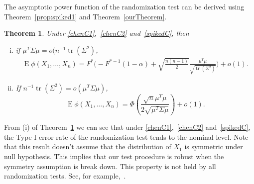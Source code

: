 \documentclass[3p]{elsarticle}
\DeclareMathOperator{\mytr}{tr}
\DeclareMathOperator{\myE}{E}
\theoremstyle{plain}
\newtheorem{theorem}{\quad\quad Theorem}
\theoremstyle{definition}
\newtheorem{remark}{\quad\quad Remark}
\theoremstyle{remark}
\begin{document}
The asymptotic power function of the randomization test can be derived using Theorem~\ref{prop:spiked1} and Theorem~\ref{ourTheorem}.

\begin{theorem}\label{theoremPower}
    Under \eqref{chenC1},~\eqref{chenC2} and~\eqref{spikedC}, then
    \begin{enumerate}[(i)]
        \item
if $\mu^T \Sigma \mu= o(n^{-1}\mytr(\Sigma^2)$,
    \begin{equation}\label{oPower}
        \begin{aligned}
            \myE \phi(X_1,\ldots,X_n)=
            F^*\Big(-F^{*-1}(1-\alpha)+\sqrt{\frac{n(n-1)}{2}}\frac{\mu^T\mu}{\sqrt{\mytr (\Sigma^2)}}\Big)+o(1).
        \end{aligned}
    \end{equation}
\item
    If $n^{-1}\mytr(\Sigma^2)=o(\mu^T \Sigma \mu )$,
            \begin{equation}\label{oPower2}
            \myE \phi(X_1,\ldots,X_n)=
            \Phi(\frac{\sqrt{n}\mu^T\mu}{2\sqrt{\mu^T \Sigma \mu}})+o(1).
    \end{equation}

    \end{enumerate}
\end{theorem}




From (i) of Theorem~\ref{theoremPower} we can see that under \eqref{chenC1},~\eqref{chenC2} and~\eqref{spikedC}, the Type I error rate of the randomization test tends to the nominal level.
Note that this result doesn't assume that the distribution of $X_1$ is symmetric under null hypothesis.
This implies that our test procedure is robust when the symmetry assumption is break down.
This property is not held by all randomization tests.
See, for example,~\cite{Romano1990On}.
\end{document}
